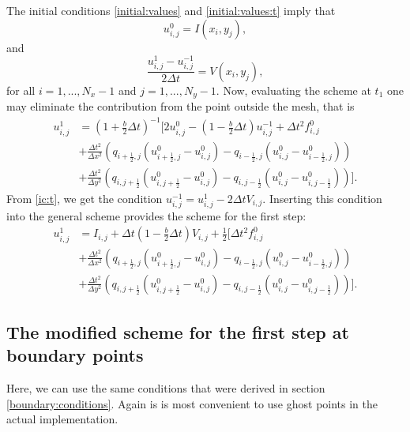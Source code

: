 \documentclass[twoside]{article}
\begin{document}
The initial conditions \eqref{initial:values} and \eqref{initial:values:t} imply that
\begin{equation}
u_{i,j}^0 = I(x_i, y_j), 
\label{ic}
\end{equation}
and
\begin{equation}
\frac{u_{i,j}^{1} - u_{i,j}^{-1}}{2 \Delta t} = V(x_i,y_j),
\label{ic:t}
\end{equation}
for all  $i=1, ..., N_x - 1$ and $j=1, ..., N_y - 1$.
Now, evaluating the scheme at $t_1$ one may eliminate the contribution from the point outside the mesh, that is
\begin{align*}
u_{i,j}^{1} &= (1+\frac{b}{2}\Delta t)^{-1} \bigg[2u_{i,j}^0 - (1-\frac{b}{2}\Delta t) u_{i,j}^{-1} + \Delta t^2 f_{i,j}^0 \nonumber \\
&+ \frac{\Delta t^2}{\Delta x^2} \left(q_{i+\frac{1}{2},j} (u_{i+\frac{1}{2},j}^0 - u_{i,j}^0) -  q_{i-\frac{1}{2},j} (u_{i,j}^0 - u_{i-\frac{1}{2},j}^0) \right) \\
&+ \frac{\Delta t^2}{\Delta y^2} \left(q_{i,j+\frac{1}{2}} (u_{i,j+\frac{1}{2}}^0 - u_{i,j}^0) -  q_{i,j-\frac{1}{2}} (u_{i,j}^0 - u_{i,j-\frac{1}{2}}^0) \right) \bigg]. \nonumber
\end{align*}
From \eqref{ic:t}, we get the condition $u_{i,j}^{-1} = u_{i,j}^1 - 2\Delta t V_{i,j}$. Inserting this condition into the general scheme provides the scheme for the first step:
\begin{align}
u_{i,j}^1 &= I_{i,j} + \Delta t(1- \frac{b}{2} \Delta t) V_{i,j} + \frac{1}{2} \bigg[\Delta t^2 f_{i,j}^0 \nonumber \\
&+ \frac{\Delta t^2}{\Delta x^2} \left(q_{i+\frac{1}{2},j} (u_{i+\frac{1}{2},j}^0 - u_{i,j}^0) -  q_{i-\frac{1}{2},j} (u_{i,j}^0 - u_{i-\frac{1}{2},j}^0) \right) \\
&+ \frac{\Delta t^2}{\Delta y^2} \left(q_{i,j+\frac{1}{2}} (u_{i,j+\frac{1}{2}}^0 - u_{i,j}^0) -  q_{i,j-\frac{1}{2}} (u_{i,j}^0 - u_{i,j-\frac{1}{2}}^0) \right) \bigg]. \nonumber
\end{align}

\subsection{The modified scheme for the first step at boundary points}

Here, we can use the same conditions that were derived in section \ref{boundary:conditions}. Again is is most convenient to use ghost points in the actual implementation.
\end{document}

